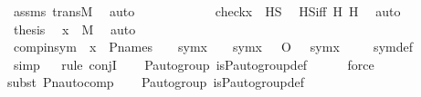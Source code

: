 \begin{isabellebody}
\ assms\ transM\ \isamarkupfalse%
\ auto\isanewline
\ \ \ \ \isamarkupfalse%
\isanewline
\isanewline
\ \ \ \ \isamarkupfalse%
\ \isamarkupfalse%
\ {\isachardoublequoteopen}check{\isacharparenleft}{\kern0pt}x{\isacharparenright}{\kern0pt}\ {\isasymin}\ HS{\isachardoublequoteclose}\ \isamarkupfalse%
\ HS{\isacharunderscore}{\kern0pt}iff\ H{}\ H{}\ \isamarkupfalse%
\ auto\isanewline
\ \ \isamarkupfalse%
\isanewline
\ \ \isamarkupfalse%
\ \isamarkupfalse%
\ {\isacharquery}{\kern0pt}thesis\ \isamarkupfalse%
\ {\isacartoucheopen}x\ {\isasymin}\ M{\isacartoucheclose}\ \isamarkupfalse%
\ auto\isanewline
{}\isamarkupfalse%
%
\endisatagproof
{\isafoldproof}%
%
\isadelimproof
\isanewline
%
\endisadelimproof
\isanewline
{}\isamarkupfalse%
\ comp{\isacharunderscore}{\kern0pt}in{\isacharunderscore}{\kern0pt}sym\ {\isacharcolon}{\kern0pt}\ {\isachardoublequoteopen}x\ {\isasymin}\ P{\isacharunderscore}{\kern0pt}names\ {\isasymLongrightarrow}\ {\isasympi}\ {\isasymin}\ sym{\isacharparenleft}{\kern0pt}x{\isacharparenright}{\kern0pt}\ {\isasymLongrightarrow}\ {\isasymtau}\ {\isasymin}\ sym{\isacharparenleft}{\kern0pt}x{\isacharparenright}{\kern0pt}\ {\isasymLongrightarrow}\ {\isasympi}\ O\ {\isasymtau}\ {\isasymin}\ sym{\isacharparenleft}{\kern0pt}x{\isacharparenright}{\kern0pt}{\isachardoublequoteclose}\ \isanewline
%
\isadelimproof
\ \ %
\endisadelimproof
%
\isatagproof
{}\isamarkupfalse%
\ sym{\isacharunderscore}{\kern0pt}def\ \isanewline
\ \ \isamarkupfalse%
\ simp\isanewline
\ \ \isamarkupfalse%
{\isacharparenleft}{\kern0pt}rule\ conjI{\isacharparenright}{\kern0pt}\isanewline
\ \ \isamarkupfalse%
\ {\isasymG}{\isacharunderscore}{\kern0pt}P{\isacharunderscore}{\kern0pt}auto{\isacharunderscore}{\kern0pt}group\ is{\isacharunderscore}{\kern0pt}P{\isacharunderscore}{\kern0pt}auto{\isacharunderscore}{\kern0pt}group{\isacharunderscore}{\kern0pt}def\ \isanewline
\ \ \ \isamarkupfalse%
\ force\isanewline
\ \ \isamarkupfalse%
{\isacharparenleft}{\kern0pt}subst\ Pn{\isacharunderscore}{\kern0pt}auto{\isacharunderscore}{\kern0pt}comp{\isacharparenright}{\kern0pt}\isanewline
\ \ \isamarkupfalse%
\ {\isasymG}{\isacharunderscore}{\kern0pt}P{\isacharunderscore}{\kern0pt}auto{\isacharunderscore}{\kern0pt}group\ is{\isacharunderscore}{\kern0pt}P{\isacharunderscore}{\kern0pt}auto{\isacharunderscore}{\kern0pt}group{\isacharunderscore}{\kern0pt}def\ \isanewline

\end{isabellebody}
